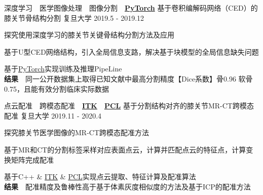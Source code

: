 

\begin{cventries}

  \cventry
    {深度学习~~医学图像处理~~图像分割~~\href{https://vtk.org/}{\textbf{PyTorch}}} %
    {基于卷积编解码网络（CED）的膝关节骨结构分割} %
    {复旦大学} %
    {2019.5 - 2019.12} %
    {
      \begin{cvitems} %
        \item {探究使用深度学习的膝关节关键骨结构分割方法及应用}
        \item {基于U型CED网络结构，引入全局信息支路，解决基于块模型的全局信息缺失问题}
        \item {基于\href{https://vtk.org/}{PyTorch}实现训练及推理PipeLine}\\
        \textbf{结果}~~同一公开数据集上取得已知文献中最高分割精度【Dice系数】骨0.96 软骨0.75，且能有效分割临床实际数据
      \end{cvitems}
    }

  \cventry
    {点云配准~~跨模态配准~~\href{https://itk.org/}{\textbf{ITK}}~~\href{https://pointclouds.org/}{\textbf{PCL}}} %
    {基于分割结构对齐的膝关节MR-CT跨模态配准} %
    {复旦大学} %
    {2019.11 - 2020.4} %
    {
      \begin{cvitems} %
        \item {探究膝关节医学图像的MR-CT跨模态配准方法}
        \item {基于MR和CT的分割标签采样对应表面点云，计算并匹配点云的特征点，计算变换矩阵完成配准}
        \item {基于C++ \& \href{https://itk.org/}{ITK} \& \href{https://pointclouds.org/}{PCL}实现点云提取、特征计算及配准算法}\\
        \textbf{结果}~~配准精度及鲁棒性高于基于体素灰度相似度的方法及基于ICP的配准方法
      \end{cvitems}
    }


\end{cventries}
